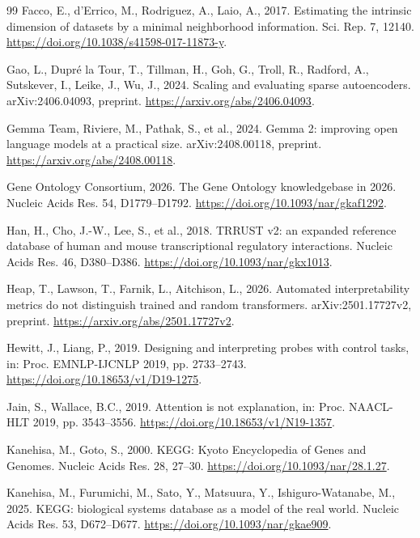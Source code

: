 \documentclass[review,authoryear,12pt]{elsarticle}
\begin{document}
\begin{thebibliography}{99}
 Facco, E., d'Errico, M., Rodriguez, A., Laio, A., 2017. Estimating the intrinsic dimension of datasets by a minimal neighborhood information. Sci. Rep. 7, 12140. \url{https://doi.org/10.1038/s41598-017-11873-y}.

 Gao, L., Dupr\'e la Tour, T., Tillman, H., Goh, G., Troll, R., Radford, A., Sutskever, I., Leike, J., Wu, J., 2024. Scaling and evaluating sparse autoencoders. arXiv:2406.04093, preprint. \url{https://arxiv.org/abs/2406.04093}.

 Gemma Team, Riviere, M., Pathak, S., et al., 2024. Gemma 2: improving open language models at a practical size. arXiv:2408.00118, preprint. \url{https://arxiv.org/abs/2408.00118}.

 Gene Ontology Consortium, 2026. The Gene Ontology knowledgebase in 2026. Nucleic Acids Res. 54, D1779--D1792. \url{https://doi.org/10.1093/nar/gkaf1292}.

 Han, H., Cho, J.-W., Lee, S., et al., 2018. TRRUST v2: an expanded reference database of human and mouse transcriptional regulatory interactions. Nucleic Acids Res. 46, D380--D386. \url{https://doi.org/10.1093/nar/gkx1013}.

 Heap, T., Lawson, T., Farnik, L., Aitchison, L., 2026. Automated interpretability metrics do not distinguish trained and random transformers. arXiv:2501.17727v2, preprint. \url{https://arxiv.org/abs/2501.17727v2}.

 Hewitt, J., Liang, P., 2019. Designing and interpreting probes with control tasks, in: Proc. EMNLP-IJCNLP 2019, pp. 2733--2743. \url{https://doi.org/10.18653/v1/D19-1275}.

 Jain, S., Wallace, B.C., 2019. Attention is not explanation, in: Proc. NAACL-HLT 2019, pp. 3543--3556. \url{https://doi.org/10.18653/v1/N19-1357}.

 Kanehisa, M., Goto, S., 2000. KEGG: Kyoto Encyclopedia of Genes and Genomes. Nucleic Acids Res. 28, 27--30. \url{https://doi.org/10.1093/nar/28.1.27}.

 Kanehisa, M., Furumichi, M., Sato, Y., Matsuura, Y., Ishiguro-Watanabe, M., 2025. KEGG: biological systems database as a model of the real world. Nucleic Acids Res. 53, D672--D677. \url{https://doi.org/10.1093/nar/gkae909}.


\end{thebibliography}
\end{document}
